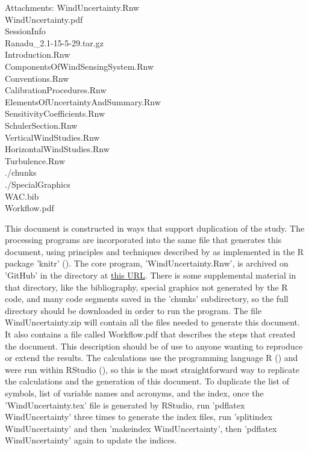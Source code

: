 \documentclass[12pt,twoside,english]{article}\usepackage[]{graphicx}\usepackage[]{color}
\let\OrgIndex\index
\renewcommand*{\index}[1]{\OrgIndex{#1}}
\newenvironment{lyxlist}[1]
{\begin{list}{}
{\settowidth{\labelwidth}{#1}
\setlength{\leftmargin}{\labelwidth}
\addtolength{\leftmargin}{\labelsep}
\renewcommand{\makelabel}[1]{##1\hfil}}}
{\end{list}}
\newcommand{\attachm}[1]{\begin{lyxlist}{Attachments:00}
\item [Attachments:] {#1}
\end{lyxlist}}
\begin{document}
\attachm{WindUncertainty.Rnw\\WindUncertainty.pdf\\SessionInfo\\Ranadu\_2.1-15-5-29.tar.gz\\Introduction.Rnw\\ComponentsOfWindSensingSystem.Rnw\\Conventions.Rnw\\CalibrationProcedures.Rnw\\ElementsOfUncertaintyAndSummary.Rnw\\SensitivityCoefficients.Rnw\\SchulerSection.Rnw\\VerticalWindStudies.Rnw\\HorizontalWindStudies.Rnw\\Turbulence.Rnw\\./chunks\\./SpecialGraphics\\WAC.bib\\Workflow.pdf}

This document is constructed in ways that support duplication of the
study. The processing programs are incorporated into the same file
that generates this document, using principles and techniques described
by \citet{Xie2014a} as implemented in the R package 'knitr' (\citet{Xie2014b}).
The core program, 'WindUncertainty.Rnw', is archived on 'GitHub' 
in
the directory at \href{https://github.com/WilliamCooper/WindUncertainty.git}{this URL}.
There is some supplemental material in that directory, like the bibliography, special graphics not generated by the R code,
and many code segments saved in the 'chunks' subdirectory, so the
full directory should be downloaded in order to run the program. The file WindUncertainty.zip will contain all the files needed to generate this document. It also contains a file called Workflow.pdf that describes the steps that created the document. This description should be of use to anyone wanting to reproduce or extend the results. The calculations
use the programming language R (\citet{Rlanguage}) and were run within RStudio
(\citet{RStudio2012}), so this is the most straightforward way to replicate the
calculations and the generation of this document. To duplicate the list of symbols, list of variable names and acronyms, and the index, once the 'WindUncertainty.tex' file is generated by RStudio, run 'pdflatex WindUncertainty' three times to generate the index files, run 'splitindex WindUncertainty' and then 'makeindex WindUncertainty', then 'pdflatex WindUncertainty' again to update the indices.
\end{document}
